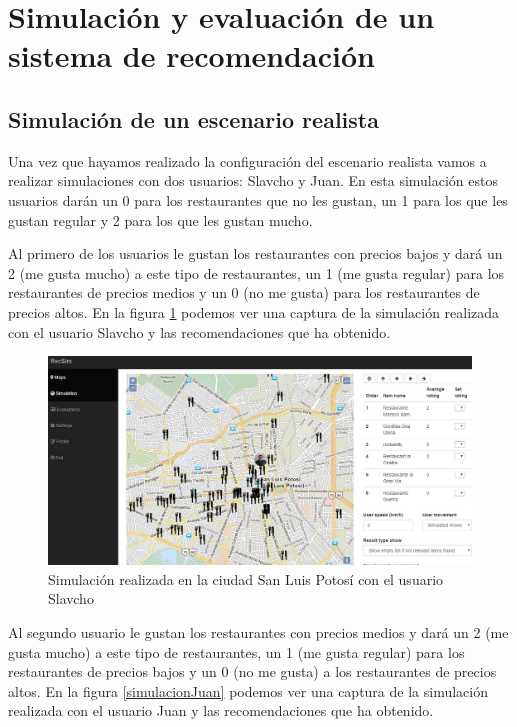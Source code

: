 \section{Simulación y evaluación de un sistema de recomendación}

\subsection{Simulación de un escenario realista}

Una vez que hayamos realizado la configuración del escenario realista vamos a realizar simulaciones con dos usuarios: Slavcho y Juan. En esta simulación estos usuarios darán un 0 para los restaurantes que no les gustan, un 1 para los que les gustan regular y 2 para los que les gustan mucho. 

Al primero de los usuarios le gustan los restaurantes con precios bajos y dará un 2 (me gusta mucho) a este tipo de restaurantes, un 1 (me gusta regular) para los restaurantes de precios medios y un 0 (no me gusta) para los restaurantes de precios altos. En la figura \ref{simulacionSlavcho} podemos ver una captura de la simulación realizada con el usuario Slavcho y las recomendaciones que ha obtenido. 

\begin{figure}[H]
	\centering\includegraphics[scale=0.35]{imagenes/explotacion/simulacion/simulacion-slavcho.jpg}
	\caption{Simulación realizada en la ciudad San Luis Potosí con el usuario Slavcho}
	\label{simulacionSlavcho}
\end{figure}

\newpage

Al segundo usuario le gustan los restaurantes con precios medios y dará un 2 (me gusta mucho) a este tipo de restaurantes, un 1 (me gusta regular) para los restaurantes de precios bajos y un 0 (no me gusta) a los restaurantes de precios altos. En la figura \ref{simulacionJuan} podemos ver una captura de la simulación realizada con el usuario Juan y las recomendaciones que ha obtenido. 

